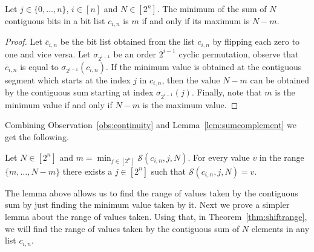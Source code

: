 \begin{lemma}
\label{lem:sumcomplement}
  Let  $j\in\{0,\dots,n\}$, $i \in [n]$ and $N\in[2^n]$. The minimum of the sum of $N$ contiguous bits in a bit list $c_{i,n}$ is $m$ if and only if its maximum is $N-m$.
\end{lemma}
\begin{proof}
 Let $\overline{c}_{i,n}$ be the bit list obtained from the list $c_{i,n}$ by flipping each zero to one and vice versa. Let $\sigma_{2^{i-1}}$ be an order $2^{i-1}$ cyclic permutation, observe that $\overline{c}_{i,n}$ is equal to $\sigma_{2^{i-1}}(c_{i,n})$.
 If the minimum value is obtained at the contiguous segment which starts at the index $j$ in $c_{i,n}$, then the value $N-m$ can be obtained by the contiguous sum starting at index $\sigma_{2^{i-1}}(j)$. Finally, note that $m$ is the minimum value if and only if $N-m$ is the maximum value.
\end{proof}

Combining Observation~\ref{obs:continuity} and Lemma~\ref{lem:sumcomplement} we get the following.

\begin{lemma}
\label{lem:minmax}
 Let $N\in[2^n]$ and $m=\min_{j \in [2^n]} \mathcal{S}(c_{i,n}, j, N)$. For every value $v$ in the range $\{m,\dots, N-m\}$ there exists a $j\in [2^n]$ such that $\mathcal{S}(c_{i,n}, j, N)=v$.
\end{lemma}

The lemma above allows us to find the range of values taken by the contiguous sum by just finding the minimum value taken by it.
Next we prove a simpler lemma about the range of values taken. Using that, in Theorem~\ref{thm:shiftrange}, we will find the range of values taken by the contiguous sum of $N$ elements in any list $c_{i,n}$.


